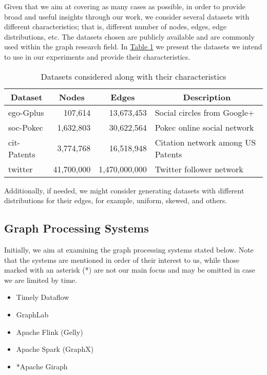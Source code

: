 \documentclass[a4paper,11pt]{article}
\begin{document}
\par Given that we aim at covering as many cases as possible, in order to provide broad and useful insights through our work, we consider several datasets with different characteristics; that is, different number of nodes, edges, edge distributions, etc. The datasets chosen are publicly available and are commonly used within the graph research field. In \hyperref[dataset-table]{Table 1} we present the datasets we intend to use in our experiments and provide their characteristics.

\bigskip

\begin{table}[H]
	\centering
	\begin{tabular}{|l|r|r|l|}
	\hline
	\multicolumn{1}{|c|}{\textbf{Dataset}} & \multicolumn{1}{c|}{\textbf{Nodes}} & \multicolumn{1}{c|}{\textbf{Edges}} & \multicolumn{1}{c|}{\textbf{Description}} \\ \hline
	\hline
	ego-Gplus \cite{snapnets} & 107,614 & 13,673,453 & Social circles from Google+ \\ \hline
	soc-Pokec \cite{snapnets} & 1,632,803 & 30,622,564 & Pokec online social network \\ \hline
	cit-Patents \cite{snapnets} & 3,774,768 & 16,518,948 & Citation network among US Patents \\ \hline
	twitter \cite{twitter} & 41,700,000 & 1,470,000,000 & Twitter follower network \\ \hline
	\end{tabular}
	\caption{Datasets considered along with their characteristics}
	\label{dataset-table}
\end{table}

\par Additionally, if needed, we might consider generating datasets with different distributions for their edges, for example, uniform, skewed, and others.

\subsection{Graph Processing Systems} \label{graph-proc}

\par Initially, we aim at examining the graph processing systems stated below. Note that the systems are mentioned in order of their interest to us, while those marked with an asterisk (*) are not our main focus and may be omitted in case we are limited by time.

\begin{itemize}

	\item Timely Dataflow \cite{naiad, timelydf}
	\item GraphLab \cite{graphlab}
	\item Apache Flink (Gelly) \cite{flink}
	\item Apache Spark (GraphX) \cite{spark,graphxpaper}
	\item *Apache Giraph \cite{giraph}

\end{itemize}
\end{document}
